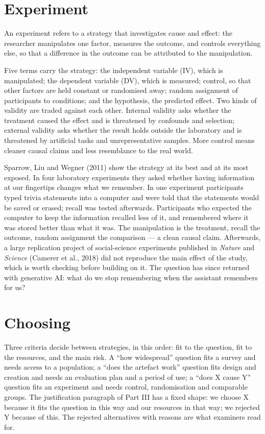 \documentclass[11pt,a4paper,british,twoside=false,headings=small,chapterprefix=false,numbers=noenddot]{scrbook}
\newenvironment{block}[1]{\begin{tcolorbox}[scriptbox, title={#1}]}{\end{tcolorbox}}
\begin{document}
\section{Experiment}

\begin{block}{Experiment}
An experiment refers to a strategy that investigates cause and effect: the researcher manipulates one factor, measures the outcome, and controls everything else, so that a difference in the outcome can be attributed to the manipulation.
\end{block}

Five terms carry the strategy: the independent variable (IV), which is manipulated; the dependent variable (DV), which is measured; control, so that other factors are held constant or randomised away; random assignment of participants to conditions; and the hypothesis, the predicted effect. Two kinds of validity are traded against each other. Internal validity asks whether the treatment caused the effect and is threatened by confounds and selection; external validity asks whether the result holds outside the laboratory and is threatened by artificial tasks and unrepresentative samples. More control means cleaner causal claims and less resemblance to the real world.

Sparrow, Liu and Wegner (2011) show the strategy at its best and at its most exposed. In four laboratory experiments they asked whether having information at our fingertips changes what we remember. In one experiment participants typed trivia statements into a computer and were told that the statements would be saved or erased; recall was tested afterwards. Participants who expected the computer to keep the information recalled less of it, and remembered where it was stored better than what it was. The manipulation is the treatment, recall the outcome, random assignment the comparison --- a clean causal claim. Afterwards, a large replication project of social-science experiments published in \emph{Nature} and \emph{Science} (Camerer et al., 2018) did not reproduce the main effect of the study, which is worth checking before building on it. The question has since returned with generative AI: what do we stop remembering when the assistant remembers for us?

\section{Choosing}

Three criteria decide between strategies, in this order: fit to the question, fit to the resources, and the main risk. A ``how widespread'' question fits a survey and needs access to a population; a ``does the artefact work'' question fits design and creation and needs an evaluation plan and a period of use; a ``does X cause Y'' question fits an experiment and needs control, randomisation and comparable groups. The justification paragraph of Part III has a fixed shape: we choose X because it fits the question in this way and our resources in that way; we rejected Y because of this. The rejected alternatives with reasons are what examiners read for.
\end{document}
